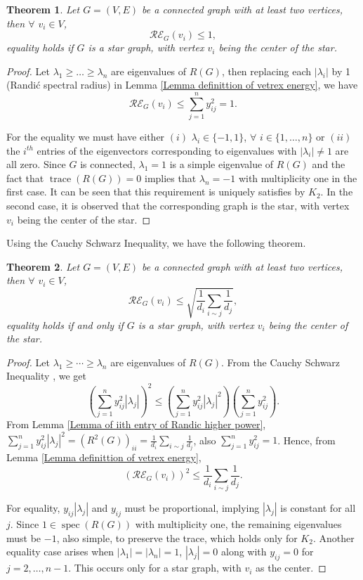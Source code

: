 \documentclass[10 pt]{article}
\newtheorem{theorem}{Theorem}[section]
\numberwithin{equation}{section}
\newcommand{\spec}{\operatorname{spec}}
\newcommand{\trace}{\operatorname{trace}}
\begin{document}
\begin{theorem}
Let $G=(V,E)$ be a connected graph with at least two vertices, then $\forall$ $v_i\in V$,
$$\mathcal{RE}_G(v_i)\leq 1,$$
equality holds if $G$ is a star graph, with vertex $v_i$ being the center of the star.
\end{theorem}
\begin{proof}
Let $\lambda_1\geq\ldots\geq\lambda_n$ are eigenvalues of $R(G)$, then replacing each $|\lambda_i|$ by 1 (Randi\'c spectral radius) in Lemma \ref{Lemma definittion of vetrex energy}, we have
$$\mathcal{RE}_G(v_i)\leq\sum\limits_{j=1}^ny^{2}_{ij}=1.$$

For the equality we must have either $(i)$ $\lambda_i\in \{-1,1\}$, $\forall$ $i\in \{1,\ldots,n\}$ or $(ii)$ the $i^{th}$ entries of the eigenvectors corresponding to eigenvalues with $|\lambda_i|\neq 1$ are all zero. Since $G$ is connected, $\lambda_1=1$ is a simple eigenvalue of $R(G)$ and the fact that $\trace(R(G))=0$ implies that $\lambda_n=-1$ with multiplicity one in the first case. It can be seen that this requirement is uniquely satisfies by $K_2$. In the second case, it is observed that the corresponding graph is the star, with vertex $v_i$ being the center of the star.
\end{proof}

Using the Cauchy Schwarz Inequality, we have the following theorem.

\begin{theorem}\label{Randic vertex energy upper bound 1}
Let $G=(V,E)$ be a connected graph with at least two vertices, then $\forall$ $v_i\in V$,
$$\mathcal{RE}_G(v_i)\leq\sqrt{\frac{1}{d_i}\sum\limits_{i\sim j}\frac{1}{d_j}},$$
equality holds if and only if $G$ is a star graph, with vertex $v_i$ being the center of the star.
\end{theorem}
\begin{proof}
Let $\lambda_1 \geq \cdots \geq \lambda_n$ are eigenvalues of $R(G)$. From the Cauchy Schwarz Inequality \cite{Bhatia1997}, we get
$$\left(\sum\limits_{j=1}^{n}y^2_{ij}|\lambda_{j}|\right)^2\leq \left(\sum\limits_{j=1}^{n}y^2_{ij}|\lambda_{j}|^2\right)\left(\sum\limits_{j=1}^{n}y^2_{ij}\right).$$
From Lemma \ref{Lemma of iith entry of Randic higher power}, $\sum\limits_{j=1}^{n}y^2_{ij}|\lambda_{j}|^2=\left(R^2(G)\right)_{ii}=\frac{1}{d_i}\sum\limits_{i\sim j}\frac{1}{d_j}$, also $\sum\limits_{j=1}^{n}y^2_{ij}=1$. Hence, from Lemma \ref{Lemma definittion of vetrex energy},
$$\left(\mathcal{RE}_G(v_i)\right)^2\leq \frac{1}{d_i}\sum\limits_{i\sim j}\frac{1}{d_j}.$$

For equality, $y_{ij}|\lambda_j|$ and $y_{ij}$ must be proportional, implying $|\lambda_j|$ is constant for all $j$. Since $1\in\spec(R(G))$ with multiplicity one, the remaining eigenvalues must be $-1$, also simple, to preserve the trace, which holds only for $K_2$. Another equality case arises when $|\lambda_1|=|\lambda_n|=1$, $|\lambda_j|=0$ along with $y_{ij}=0$ for $j=2,\ldots,n-1$. This occurs only for a star graph, with $v_i$ as the center.
\end{proof}
\end{document}
